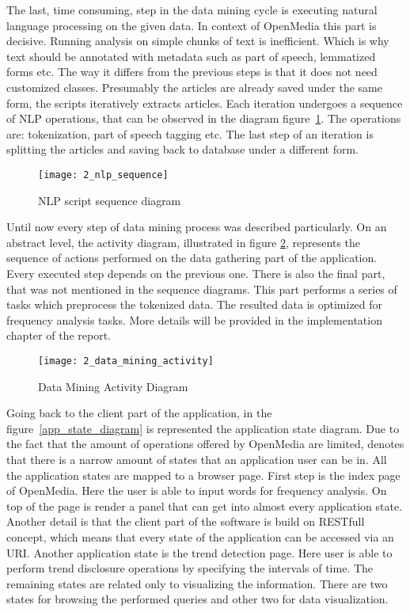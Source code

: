 The last, time consuming, step in the data mining cycle is executing natural language processing on the given data. In context of OpenMedia this part is decisive. Running analysis on simple chunks of text is inefficient. Which is why text should be annotated with metadata such as part of speech, lemmatized forms etc. The way it differs from the previous steps is that it does not need customized classes. Presumably the articles are already saved under the same form, the scripts iteratively extracts articles. Each iteration undergoes a sequence of NLP operations, that can be observed in the diagram \mbox{figure \ref{nlp_sequence}}. The operations are: tokenization, part of speech tagging etc. The last step of an iteration is splitting the articles and saving back to database under a different form.

\begin{figure}[!ht]
\centering
\texttt{[image: 2\_nlp\_sequence]}
\caption{NLP script sequence diagram}\label{nlp_sequence}
\end{figure}

Until now every step of data mining process was described particularly. On an abstract level, the activity diagram, illustrated in figure \mbox{\ref{data_mining_activity}}, represents the sequence of actions performed on the data gathering part of the application. Every executed step depends on the previous one. There is also the final part, that was not mentioned in the sequence diagrams. This part performs a series of tasks which preprocess the tokenized data. The resulted data is optimized for frequency analysis tasks. More details will be provided in the implementation chapter of the report.

\begin{figure}[!ht]
\centering
\vspace*{0.6cm}
\texttt{[image: 2\_data\_mining\_activity]}
\caption{Data Mining Activity Diagram}\label{data_mining_activity}
\end{figure}

Going back to the client part of the application, in the \mbox{figure \ref{app_state_diagram}} is represented the application state diagram. Due to the fact that the amount of operations offered by OpenMedia are limited, denotes that there is a narrow amount of states that an application user can be in. All the application states are mapped to a browser page. First step is the index page of OpenMedia. Here the user is able to input words for frequency analysis. On top of the page is render a panel that can get into almost every application state. Another detail is that the client part of the software is build on RESTfull concept, which means that every state of the application can be accessed via an URI. Another application state is the trend detection page. Here user is able to perform trend disclosure operations by specifying the intervals of time. The remaining states are related only to visualizing the information. There are two states for browsing the performed queries and other two for data visualization.

